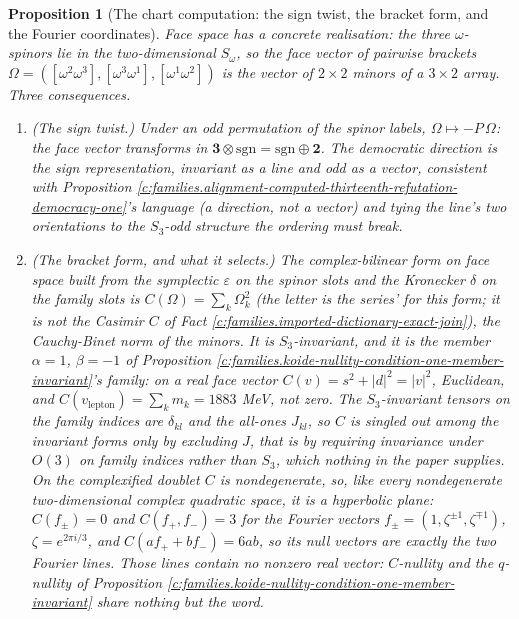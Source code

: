 \documentclass[11pt]{article}
\newtheorem{proposition}[theorem]{Proposition}
\theoremstyle{definition}
\theoremstyle{plain}
\newcommand{\changedmark}[2]{\marginpar{\raggedright\scriptsize\color{#1}#2}}
\begin{document}
\begin{proposition}[The chart computation: the sign twist, the bracket form, and the Fourier coordinates]\label{c:families.chart-computation-sign-twist-bracket-form}
\changedmark{gray}{reworded}
Face space has a concrete realisation: the three $\omega$-spinors lie in the two-dimensional $S_{\omega}$, so the face vector of pairwise brackets $\Omega = ([\omega^{2}\omega^{3}], [\omega^{3}\omega^{1}], [\omega^{1}\omega^{2}])$ is the vector of $2 \times 2$ minors of a $3 \times 2$ array. Three consequences.
\begin{enumerate}
\item \emph{(The sign twist.)} Under an odd permutation of the spinor labels, $\Omega \mapsto -P\,\Omega$: the face vector transforms in $\mathbf{3} \otimes \mathrm{sgn} = \mathrm{sgn} \oplus \mathbf{2}$. The democratic direction is the sign representation, invariant as a line and odd as a vector, consistent with Proposition \ref{c:families.alignment-computed-thirteenth-refutation-democracy-one}'s language (a direction, not a vector) and tying the line's two orientations to the $S_{3}$-odd structure the ordering must break.
\item \emph{(The bracket form, and what it selects.)} The complex-bilinear form on face space built from the symplectic $\varepsilon$ on the spinor slots and the Kronecker $\delta$ on the family slots is $C(\Omega) = \sum_{k}\Omega_{k}^{2}$ (the letter is the series' for this form; it is not the Casimir $C$ of Fact \ref{c:families.imported-dictionary-exact-join}), the Cauchy-Binet norm of the minors. It is $S_{3}$-invariant, and it is the member $\alpha = 1$, $\beta = -1$ of Proposition \ref{c:families.koide-nullity-condition-one-member-invariant}'s family: on a real face vector $C(v) = s^{2} + |d|^{2} = |v|^{2}$, Euclidean, and $C(v_{\mathrm{lepton}}) = \sum_{k} m_{k} = 1883$ MeV, not zero. The $S_{3}$-invariant tensors on the family indices are $\delta_{kl}$ and the all-ones $J_{kl}$, so $C$ is singled out among the invariant forms only by excluding $J$, that is by requiring invariance under $O(3)$ on family indices rather than $S_{3}$, which nothing in the paper supplies. On the complexified doublet $C$ is nondegenerate, so, like every nondegenerate two-dimensional complex quadratic space, it is a hyperbolic plane: $C(f_{\pm}) = 0$ and $C(f_{+}, f_{-}) = 3$ for the Fourier vectors $f_{\pm} = (1, \zeta^{\pm 1}, \zeta^{\mp 1})$, $\zeta = e^{2\pi i/3}$, and $C(af_{+} + bf_{-}) = 6ab$, so its null vectors are exactly the two Fourier lines. Those lines contain no nonzero real vector: $C$-nullity and the $q$-nullity of Proposition \ref{c:families.koide-nullity-condition-one-member-invariant} share nothing but the word.

\end{enumerate}
\end{proposition}
\end{document}
